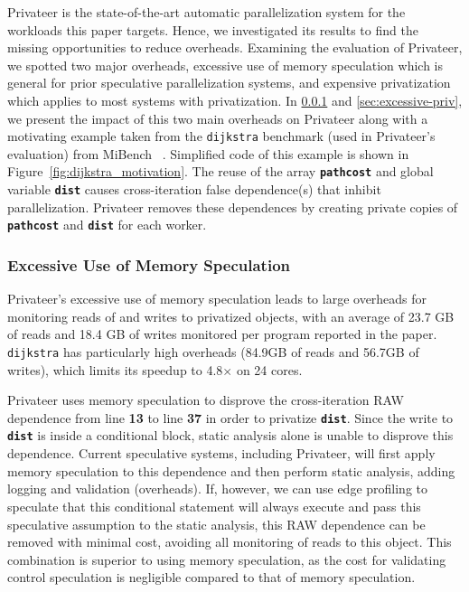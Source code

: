 Privateer is the state-of-the-art automatic parallelization system for the
workloads this paper targets. Hence, we investigated its results to find
the missing opportunities to reduce overheads.
%
Examining the evaluation of Privateer, we spotted two major overheads,
excessive use of memory speculation which is general for prior speculative
parallelization systems, and expensive privatization which applies to
most systems with privatization.
%
In \ref{sec:excessive-memory-spec} and \ref{sec:excessive-priv}, we present
the impact of this two main overheads on Privateer along with a motivating
example taken from the \texttt{dijkstra} benchmark (used in Privateer's
evaluation) from MiBench ~\cite{guthaus:2001:iiwsc}. Simplified code of this example is
shown in Figure~\ref{fig:dijkstra_motivation}. The reuse of the array
\texttt{\textbf{pathcost}} and global variable \texttt{\textbf{dist}}
causes cross-iteration false dependence(s) that inhibit parallelization.
Privateer removes these dependences by creating private copies of
\texttt{\textbf{pathcost}} and \texttt{\textbf{dist}} for each worker.

\subsubsection{Excessive Use of Memory Speculation}
\label{sec:excessive-memory-spec}

Privateer's excessive use of memory speculation leads to large overheads
for monitoring reads of and writes to privatized objects, with an average
of 23.7 GB of reads and 18.4 GB of writes monitored per program reported in
the paper. \texttt{dijkstra} has particularly high overheads (84.9GB of
reads and 56.7GB of writes), which limits its speedup to 4.8$\times$ on 24
cores.


Privateer uses memory speculation to disprove the cross-iteration
RAW dependence from line \textbf{13} to line \textbf{37} in order to
privatize \texttt{\textbf{dist}}. Since the write to \texttt{\textbf{dist}}
is inside a conditional block, static analysis alone is unable to disprove
this dependence. Current speculative systems, including Privateer, will
first apply memory speculation to this dependence and then perform static
analysis, adding logging and validation (overheads). If, however, we can
use edge profiling to speculate that this conditional statement will always
execute and pass this speculative assumption to the static analysis, this
RAW dependence can be removed with minimal cost, avoiding all monitoring of
reads to this object. This combination is superior to using memory
speculation, as the cost for validating control speculation is negligible
compared to that of memory speculation.

